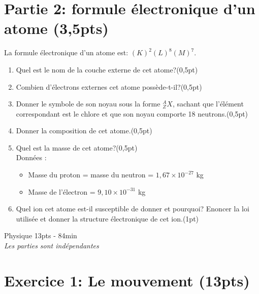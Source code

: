 \documentclass[12pt]{article}
\begin{document}
\section*{Partie 2: formule électronique d'un atome \dotfill(3,5pts)}
La formule électronique d'un atome est: $(K)^2(L)^8(M)^7$.

\begin{enumerate}
	\item Quel est le nom de la couche externe de cet atome?\dotfill(0,5pt)

	\item Combien d'électrons externes cet atome possède-t-il?\dotfill(0,5pt)

	\item Donner le symbole de son noyau sous la forme ${^{A}_{Z}X}$, sachant que l'élément correspondant est le chlore et que son noyau comporte 18 neutrons.\dotfill(0,5pt)

	\item Donner la composition de cet atome.\dotfill(0,5pt)

	\item Quel est la masse de cet atome?\dotfill(0,5pt) \\
	      Données :
	      \begin{itemize}
		      \item Masse du proton = masse du neutron = $1,67 \times 10^{-27}$ kg
		      \item Masse de l'électron = $9,10 \times 10^{-31}$ kg
	      \end{itemize}

	\item Quel ion cet atome est-il susceptible de donner et pourquoi? Enoncer la loi utilisée et donner la structure électronique de cet ion.\dotfill(1pt)
\end{enumerate}


\newpage
\begin{center}
	\hrulefill
	\Large{Physique 13pts - 84min}
	\hrulefill\\
	\emph{Les  parties sont indépendantes}
\end{center}
\section*{Exercice 1: Le mouvement \dotfill(13pts) }
\end{document}
